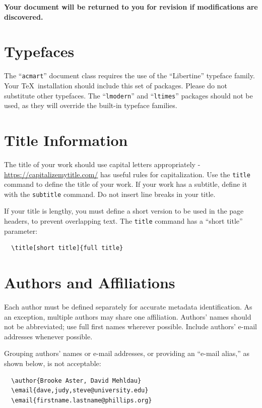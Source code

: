\documentclass[manuscript,screen,review]{acmart}
\begin{document}
{\bfseries Your document will be returned to you for revision if
  modifications are discovered.}

\section{Typefaces}

The ``\verb|acmart|'' document class requires the use of the
``Libertine'' typeface family. Your \TeX\ installation should include
this set of packages. Please do not substitute other typefaces. The
``\verb|lmodern|'' and ``\verb|ltimes|'' packages should not be used,
as they will override the built-in typeface families.

\section{Title Information}

The title of your work should use capital letters appropriately -
\url{https://capitalizemytitle.com/} has useful rules for
capitalization. Use the {\verb|title|} command to define the title of
your work. If your work has a subtitle, define it with the
{\verb|subtitle|} command.  Do not insert line breaks in your title.

If your title is lengthy, you must define a short version to be used
in the page headers, to prevent overlapping text. The \verb|title|
command has a ``short title'' parameter:
\begin{verbatim}
  \title[short title]{full title}
\end{verbatim}

\section{Authors and Affiliations}

Each author must be defined separately for accurate metadata
identification.  As an exception, multiple authors may share one
affiliation. Authors' names should not be abbreviated; use full first
names wherever possible. Include authors' e-mail addresses whenever
possible.

Grouping authors' names or e-mail addresses, or providing an ``e-mail
alias,'' as shown below, is not acceptable:
\begin{verbatim}
  \author{Brooke Aster, David Mehldau}
  \email{dave,judy,steve@university.edu}
  \email{firstname.lastname@phillips.org}
\end{verbatim}
\end{document}
